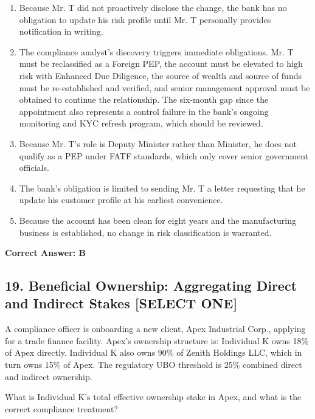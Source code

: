 \documentclass[11pt,a4paper]{article}
\begin{document}
	\begin{enumerate}[label=\Alph*.]
		\item Because Mr. T did not proactively disclose the change, the bank has no obligation to update his risk profile until Mr. T personally provides notification in writing.
		\item The compliance analyst's discovery triggers immediate obligations. Mr. T must be reclassified as a Foreign PEP, the account must be elevated to high risk with Enhanced Due Diligence, the source of wealth and source of funds must be re-established and verified, and senior management approval must be obtained to continue the relationship. The six-month gap since the appointment also represents a control failure in the bank's ongoing monitoring and KYC refresh program, which should be reviewed.
		\item Because Mr. T's role is Deputy Minister rather than Minister, he does not qualify as a PEP under FATF standards, which only cover senior government officials.
		\item The bank's obligation is limited to sending Mr. T a letter requesting that he update his customer profile at his earliest convenience.
		\item Because the account has been clean for eight years and the manufacturing business is established, no change in risk classification is warranted.
	\end{enumerate}
	\textbf{Correct Answer: B}
	
	\subsection{19. Beneficial Ownership: Aggregating Direct and Indirect Stakes \textnormal{[SELECT ONE]}}
	
	A compliance officer is onboarding a new client, Apex Industrial Corp., applying for a trade finance facility. Apex's ownership structure is: Individual K owns 18\% of Apex directly. Individual K also owns 90\% of Zenith Holdings LLC, which in turn owns 15\% of Apex. The regulatory UBO threshold is 25\% combined direct and indirect ownership.
	
	What is Individual K's total effective ownership stake in Apex, and what is the correct compliance treatment?
	
\end{document}

